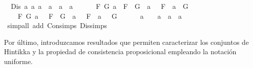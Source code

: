 \begin{isabellebody}
\ \ {\isachardoublequoteopen}Dis\ a{}\ a{}\ a{}\ {\isacharequal}\ {\isacharparenleft}a{}\ {\isacharequal}\ a{}\ \isactrlbold {\isasymor}\ a{}\ {\isasymor}\ \isanewline
\ \ \ \ {\isacharparenleft}{\isasymexists}F\ G{\isachardot}\ a{}\ {\isacharequal}\ F\ \isactrlbold {\isasymrightarrow}\ G\ {\isasymand}\ a{}\ {\isacharequal}\ \isactrlbold {\isasymnot}\ F\ {\isasymand}\ a{}\ {\isacharequal}\ G{\isacharparenright}\ {\isasymor}\ \isanewline
\ \ \ \ {\isacharparenleft}{\isasymexists}F\ G{\isachardot}\ a{}\ {\isacharequal}\ \isactrlbold {\isasymnot}\ {\isacharparenleft}F\ \isactrlbold {\isasymand}\ G{\isacharparenright}\ {\isasymand}\ a{}\ {\isacharequal}\ \isactrlbold {\isasymnot}\ F\ {\isasymand}\ a{}\ {\isacharequal}\ \isactrlbold {\isasymnot}\ G{\isacharparenright}\ {\isasymor}\ \isanewline
\ \ \ \ a{}\ {\isacharequal}\ \isactrlbold {\isasymnot}\ {\isacharparenleft}\isactrlbold {\isasymnot}\ a{}{\isacharparenright}\ {\isasymand}\ a{}\ {\isacharequal}\ a{}{\isacharparenright}{\isachardoublequoteclose}\ \isanewline
%
\isadelimproof
\ \ %
\endisadelimproof
%
\isatagproof
{}\isamarkupfalse%
\ {\isacharparenleft}simp{\isacharunderscore}all\ add{\isacharcolon}\ Con{\isachardot}simps\ Dis{\isachardot}simps{\isacharparenright}%
\endisatagproof
{\isafoldproof}%
%
\isadelimproof
%
\endisadelimproof
%
\begin{isamarkuptext}%
Por último, introduzcamos resultados que permiten caracterizar los conjuntos de Hintikka y la 
  propiedad de consistencia proposicional empleando la notación uniforme.


\end{isamarkuptext}
\end{isabellebody}
